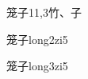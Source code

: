 \begin{entry}{笼子}{11,3}{⽵、⼦}
  \begin{phonetics}{笼子}{long2zi5}
  \end{phonetics}
  \begin{phonetics}{笼子}{long3zi5}
  \end{phonetics}
\end{entry}

